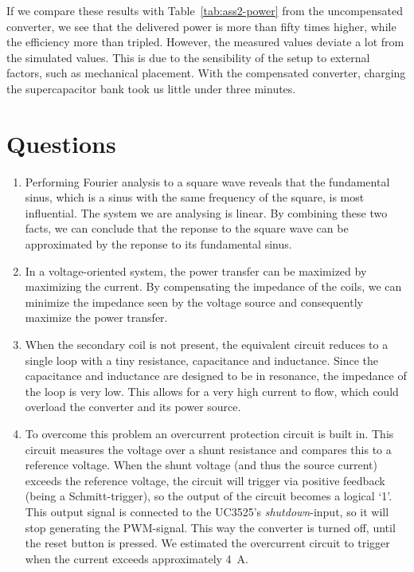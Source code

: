 \documentclass[11pt,titlepage]{report}
\begin{document}
If we compare these results with Table~\ref{tab:ass2-power} from the uncompensated converter, we see that the delivered power is more than fifty times higher, while the efficiency more than tripled. However, the measured values deviate a lot from the simulated values. This is due to the sensibility of the setup to external factors, such as mechanical placement. With the compensated converter, charging the supercapacitor bank took us little under three minutes.

\section{Questions}
\begin{enumerate}
\item
Performing Fourier analysis to a square wave reveals that the fundamental sinus, which is a sinus with the same frequency of the square, is most influential. The system we are analysing is linear. By combining these two facts, we can conclude that the reponse to the square wave can be approximated by the reponse to its fundamental sinus.

\item
In a voltage-oriented system, the power transfer can be maximized by maximizing the current. By compensating the impedance of the coils, we can minimize the impedance seen by the voltage source and consequently maximize the power transfer.

\item
When the secondary coil is not present, the equivalent circuit reduces to a single loop with a tiny resistance, capacitance and inductance. Since the capacitance and inductance are designed to be in resonance, the impedance of the loop is very low. This allows for a very high current to flow, which could overload the converter and its power source.

\item
To overcome this problem an overcurrent protection circuit is built in. This circuit measures the voltage over a shunt resistance and compares this to a reference voltage. When the shunt voltage (and thus the source current) exceeds the reference voltage, the circuit will trigger via positive feedback (being a Schmitt-trigger), so the output of the circuit becomes a logical `1'. This output signal is connected to the UC3525's \textit{shutdown}-input, so it will stop generating the PWM-signal. This way the converter is turned off, until the reset button is pressed. We estimated the overcurrent circuit to trigger when the current exceeds approximately \SI{4}{A}.
\end{enumerate}
\end{document}
